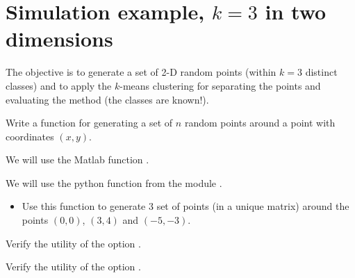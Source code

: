 \section{Simulation example, $k=3$ in two dimensions}

\vspace*{-6pt}%

The objective is to generate a set of 2-D random points (within $k=3$ distinct classes) and to apply the $k$-means clustering for separating the points and evaluating the method (the classes are known!).
\begin{qbox}
Write a function for generating a set of $n$ random points around a point with coordinates $(x,y)$.
 \end{qbox}

\vspace*{-4pt}

\begin{mcomment}
\begin{mremark}We will use the Matlab function .\end{mremark}
\end{mcomment}
\begin{pcomment}
\begin{premark}We will use the python function  from the module .
\end{premark}
\end{pcomment}
 
\begin{qbox}
\begin{itemize}
\item Use this function to generate 3 set of points (in a unique matrix) around the points $(0,0)$, $(3,4)$ and $(-5,-3)$.



\end{itemize}
 \end{qbox} 
\begin{mcomment}
\begin{mremark}Verify the utility of the option .  
\end{mremark}
\end{mcomment}
\begin{pcomment}
\begin{premark}
Verify the utility of the option .
\end{premark}
\end{pcomment}

